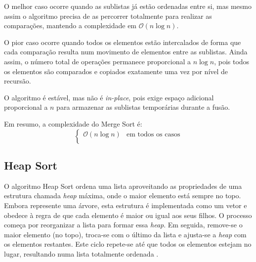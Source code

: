 \documentclass[conference]{IEEEtran}
\begin{document}
O melhor caso ocorre quando as sublistas já estão ordenadas entre si, mas mesmo assim o algoritmo precisa de as percorrer totalmente para realizar as comparações, mantendo a complexidade em \(\mathcal{O}(n \log n)\).

O pior caso ocorre quando todos os elementos estão intercalados de forma que cada comparação resulta num movimento de elementos entre as sublistas. Ainda assim, o número total de operações permanece proporcional a \(n \log n\), pois todos os elementos são comparados e copiados exatamente uma vez por nível de recursão.

O algoritmo é estável, mas não é \textit{in-place}, pois exige espaço adicional proporcional a \(n\) para armazenar as sublistas temporárias durante a fusão.

Em resumo, a complexidade do Merge Sort é:
\[
\begin{cases}
\mathcal{O}(n \log n) & \text{em todos os casos} \\
\end{cases}
\]

\subsection{Heap Sort}

O algoritmo Heap Sort ordena uma lista aproveitando as propriedades de uma estrutura chamada \textit{heap} máxima, onde o maior elemento está sempre no topo. Embora represente uma árvore, esta estrutura é implementada como um vetor e obedece à regra de que cada elemento é maior ou igual aos seus filhos. O processo começa por reorganizar a lista para formar essa \textit{heap}. Em seguida, remove-se o maior elemento (no topo), troca-se com o último da lista e ajusta-se a \textit{heap} com os elementos restantes. Este ciclo repete-se até que todos os elementos estejam no lugar, resultando numa lista totalmente ordenada \cite{heapsort}.
\end{document}
